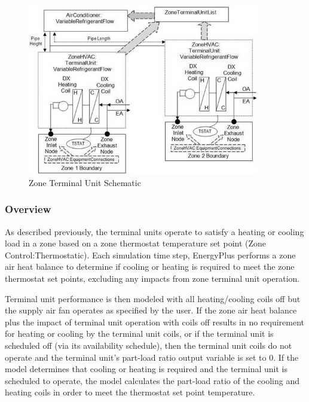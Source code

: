 \begin{figure}[hbtp] %
\centering
\includegraphics[width=0.9\textwidth, height=0.9\textheight, keepaspectratio=true]{media/image7369.png}
\caption{Zone Terminal Unit Schematic \protect \label{fig:zone-terminal-unit-schematic}}
\end{figure}

\subsubsection{Overview}\label{overview-10-000}

As described previously, the terminal units operate to satisfy a heating or cooling load in a zone based on a zone thermostat temperature set point (Zone Control:Thermostatic). Each simulation time step, EnergyPlus performs a zone air heat balance to determine if cooling or heating is required to meet the zone thermostat set points, excluding any impacts from zone terminal unit operation.

Terminal unit performance is then modeled with all heating/cooling coils off but the supply air fan operates as specified by the user. If the zone air heat balance plus the impact of terminal unit operation with coils off results in no requirement for heating or cooling by the terminal unit coils, or if the terminal unit is scheduled off (via its availability schedule), then the terminal unit coils do not operate and the terminal unit's part-load ratio output variable is set to 0. If the model determines that cooling or heating is required and the terminal unit is scheduled to operate, the model calculates the part-load ratio of the cooling and heating coils in order to meet the thermostat set point temperature.

